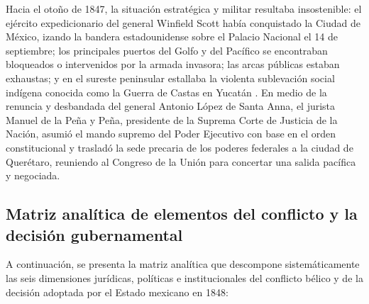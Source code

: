 \documentclass[12pt,spanish,letterpaper,oneside]{article}
\begin{document}
Hacia el oto\~no de 1847, la situaci\'on estrat\'egica y militar resultaba insostenible: el ej\'ercito expedicionario del general Winfield Scott hab\'ia conquistado la Ciudad de M\'exico, izando la bandera estadounidense sobre el Palacio Nacional el 14 de septiembre; los principales puertos del Golfo y del Pac\'ifico se encontraban bloqueados o intervenidos por la armada invasora; las arcas p\'ublicas estaban exhaustas; y en el sureste peninsular estallaba la violenta sublevaci\'on social ind\'igena conocida como la Guerra de Castas en Yucat\'an \citep[pp.~180--195]{vazquez2010}. En medio de la renuncia y desbandada del general Antonio L\'opez de Santa Anna, el jurista Manuel de la Pe\~na y Pe\~na, presidente de la Suprema Corte de Justicia de la Naci\'on, asumi\'o el mando supremo del Poder Ejecutivo con base en el orden constitucional y traslad\'o la sede precaria de los poderes federales a la ciudad de Quer\'etaro, reuniendo al Congreso de la Uni\'on para concertar una salida pac\'ifica y negociada.

\subsection{Matriz anal\'itica de elementos del conflicto y la decisi\'on gubernamental}

A continuaci\'on, se presenta la matriz anal\'itica que descompone sistem\'aticamente las seis dimensiones jur\'idicas, pol\'iticas e institucionales del conflicto b\'elico y de la decisi\'on adoptada por el Estado mexicano en 1848:
\end{document}
